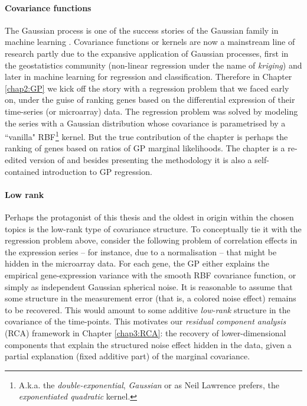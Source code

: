   \paragraph{Covariance functions}
  
  The Gaussian process is one of the success stories of the Gaussian family in machine learning \citep{Rasmussen:book06}.
  Covariance functions or kernels are now a mainstream line of research partly due to the expansive application of Gaussian processes, first in the geostatistics community (non-linear regression under the name of \emph{kriging}) and later in machine learning for regression and classification.
  Therefore in Chapter \ref{chap2:GP} we kick off the story with a regression problem that we faced early on, under the guise of ranking genes based on the differential expression of their time-series (or microarray) data.
  The regression problem was solved by modeling the series with a Gaussian distribution whose covariance is parametrised by a ``vanilla" RBF\footnote{A.k.a. the \emph{double-exponential}, \emph{Gaussian} or as Neil Lawrence prefers, the \emph{exponentiated quadratic} kernel.} kernel. But the true contribution of the chapter is perhaps the ranking of genes based on ratios of GP marginal likelihoods.
  The chapter is a re-edited version of \citep{Kalaitzis:simple11} and besides presenting the methodology it is also a self-contained introduction to GP regression.
  
  \paragraph{Low rank}
  
  Perhaps the protagonist of this thesis and the oldest in origin within the chosen topics is the low-rank type of covariance structure.
  To conceptually tie it with the regression problem above, consider the following problem of correlation effects in the expression series -- for instance, due to a normalisation -- that might be hidden in the microarray data.
  For each gene, the GP either explains the empirical gene-expression variance with the smooth RBF covariance function, or simply as independent Gaussian spherical noise.
  It is reasonable to assume that some structure in the measurement error (that is, a colored noise effect) remains to be recovered.
  This would amount to some additive \emph{low-rank} structure in the covariance of the time-points.
  This motivates our \emph{residual component analysis} (RCA) framework in Chapter \ref{chap3:RCA}: the recovery of lower-dimensional components that explain the structured noise effect hidden in the data, given a partial explanation (fixed additive part) of the marginal covariance.
  
